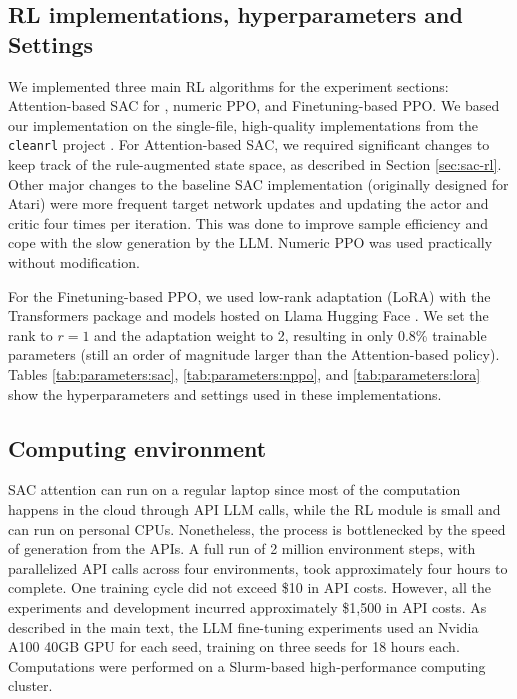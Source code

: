 \subsection{RL implementations, hyperparameters and Settings}

We implemented three main RL algorithms for the experiment sections: Attention-based SAC for \rbrl, numeric PPO, and Finetuning-based PPO. We based our implementation on the single-file, high-quality implementations from the \texttt{cleanrl} project \citep{huang2022cleanrl}. For Attention-based SAC, we required significant changes to keep track of the rule-augmented state space, as described in Section \ref{sec:sac-rl}. Other major changes to the baseline SAC implementation (originally designed for Atari) were more frequent target network updates and updating the actor and critic four times per iteration. This was done to improve sample efficiency and cope with the slow generation by the LLM. Numeric PPO was used practically without modification.

For the Finetuning-based PPO, we used low-rank adaptation (LoRA) \cite{hu2021lora} with the Transformers package and models hosted on Llama Hugging Face \cite{wolf-etal-2020-transformers}. We set the rank to $r=1$ and the adaptation weight to 2, resulting in only 0.8\% trainable parameters (still an order of magnitude larger than the Attention-based policy). Tables \ref{tab:parameters:sac}, \ref{tab:parameters:nppo}, and \ref{tab:parameters:lora} show the hyperparameters and settings used in these implementations.


\subsection{Computing environment}

SAC attention can run on a regular laptop since most of the computation happens in the cloud through API LLM calls, while the RL module is small and can run on personal CPUs. Nonetheless, the process is bottlenecked by the speed of generation from the APIs. A full run of 2 million environment steps, with parallelized API calls across four environments, took approximately four hours to complete. One training cycle did not exceed \$10 in API costs. However, all the experiments and development incurred approximately \$1,500 in API costs.
As described in the main text, the LLM fine-tuning experiments used an Nvidia A100 40GB GPU for each seed, training on three seeds for 18 hours each. Computations were performed on a Slurm-based high-performance computing cluster.


